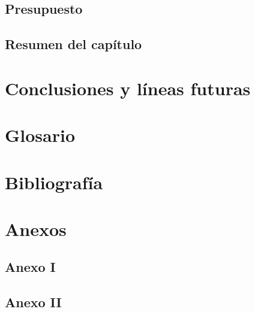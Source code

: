 \documentclass[12pt]{article}
\begin{document}
	\subsection[Presupuesto]{Presupuesto}
	\subsection[Resumen del capítulo]{Resumen del capítulo}
	
	\section[Conclusiones y líneas futuras]{Conclusiones y líneas futuras}
	
	\section*{Glosario}
	
	\section*{Bibliografía}
	
	\section*{Anexos}
	
	\subsection*{Anexo I}
	
	\subsection*{Anexo II}
	
\end{document}
